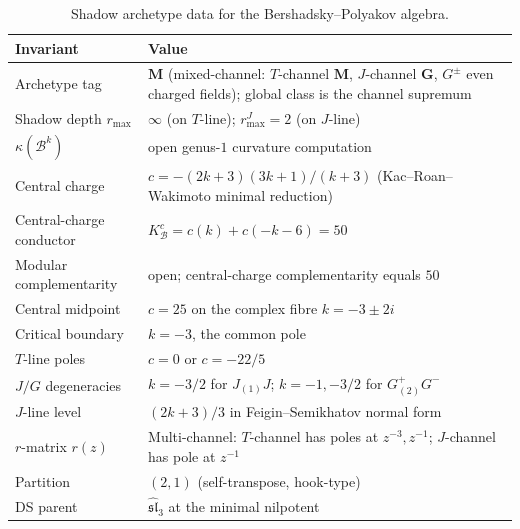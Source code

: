 \begin{table}[ht]
\centering
\small
\caption{Shadow archetype data for the Bershadsky--Polyakov
algebra.}\label{tab:bp-shadow-archetype}
\begin{tabular}{ll}
\toprule
\textbf{Invariant} & \textbf{Value} \\
\midrule
Archetype tag & $\mathbf{M}$ (mixed-channel: $T$-channel $\mathbf{M}$,
 $J$-channel $\mathbf{G}$, $G^\pm$ even charged fields);
 global class is the channel supremum \\
Shadow depth $r_{\max}$ & $\infty$ (on $T$-line);
 $r_{\max}^J = 2$ (on $J$-line) \\
$\kappa(\mathcal{B}^k)$ &
 open genus-$1$ curvature computation \\
Central charge & $c = -(2k{+}3)(3k{+}1)/(k{+}3)$
 (Kac--Roan--Wakimoto minimal reduction) \\
Central-charge conductor & $K^c_{\mathcal{B}} = c(k) + c(-k{-}6) = 50$ \\
Modular complementarity & open; central-charge complementarity equals $50$ \\
Central midpoint & $c = 25$ on the complex fibre $k = -3 \pm 2i$ \\
Critical boundary & $k = -3$, the common pole \\
$T$-line poles & $c=0$ or $c=-22/5$ \\
$J/G$ degeneracies & $k=-3/2$ for $J_{(1)}J$;
 $k=-1,-3/2$ for $G^+_{(2)}G^-$ \\
$J$-line level & $(2k+3)/3$ in Feigin--Semikhatov normal form \\
$r$-matrix $r(z)$ & Multi-channel:
 $T$-channel has poles at $z^{-3}, z^{-1}$;
 $J$-channel has pole at $z^{-1}$ \\
Partition & $(2,1)$ (self-transpose, hook-type) \\
DS parent & $\widehat{\mathfrak{sl}}_3$ at the minimal nilpotent \\
\bottomrule
\end{tabular}
\end{table}

